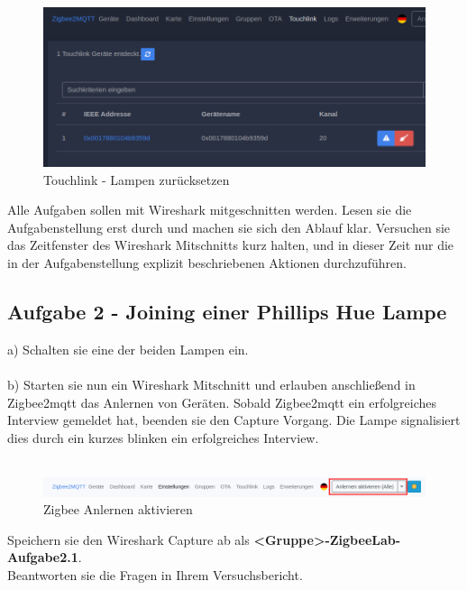 \begin{figure}[H]
    \centering
    \includegraphics[width=1\textwidth]{media/z2m-touchlink.png}
    \caption{Touchlink - Lampen zurücksetzen}
\end{figure}

\begin{Hinweis}
    Alle Aufgaben sollen mit Wireshark mitgeschnitten werden. Lesen sie die Aufgabenstellung erst durch und machen sie sich den Ablauf klar. Versuchen sie das 
    Zeitfenster des Wireshark Mitschnitts kurz halten, und in dieser Zeit nur die in der Aufgabenstellung explizit beschriebenen Aktionen durchzuführen.
\end{Hinweis}

\subsection{Aufgabe 2 - Joining einer Phillips Hue Lampe}
a) Schalten sie eine der beiden Lampen ein.\\\\
b) Starten sie nun ein Wireshark Mitschnitt und erlauben anschließend in Zigbee2mqtt das Anlernen von Geräten. Sobald Zigbee2mqtt ein erfolgreiches Interview gemeldet hat, 
beenden sie den Capture Vorgang. Die Lampe signalisiert dies durch ein kurzes blinken ein erfolgreiches Interview.\\\\

\begin{figure}[H]
    \centering
    \includegraphics[width=1\textwidth]{media/Z2M-Anlernen.png}
    \caption{Zigbee Anlernen aktivieren}
\end{figure}

\begin{Aufgabe}
    Speichern sie den Wireshark Capture ab als \textbf{\grqq <Gruppe>-ZigbeeLab-Aufgabe2.1\grqq{}}. \\
    Beantworten sie die Fragen in Ihrem Versuchsbericht.
\end{Aufgabe}

